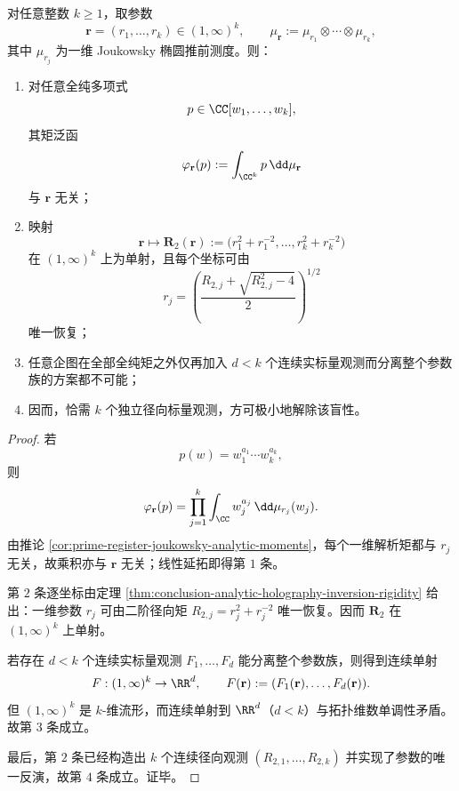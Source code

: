 \begin{theorem}\label{thm:conclusion-joukowsky-product-analytic-blindness-minimal-radial-sufficiency}
对任意整数 \(k\ge 1\)，取参数
\[
\mathbf r=(r_1,\dots,r_k)\in(1,\infty)^k,
\qquad
\mu_{\mathbf r}:=\mu_{r_1}\otimes\cdots\otimes\mu_{r_k},
\]
其中 \(\mu_{r_j}\) 为一维 Joukowsky 椭圆推前测度。则：
\begin{enumerate}
  \item 对任意全纯多项式
        \[
        p\in\CC[w_1,\dots,w_k],
        \]
        其矩泛函
        \[
        \varphi_{\mathbf r}(p):=\int_{\CC^k}p\,\dd\mu_{\mathbf r}
        \]
        与 \(\mathbf r\) 无关；
  \item 映射
        \[
        \mathbf r\longmapsto \mathbf R_2(\mathbf r):=
        \bigl(r_1^2+r_1^{-2},\dots,r_k^2+r_k^{-2}\bigr)
        \]
        在 \((1,\infty)^k\) 上为单射，且每个坐标可由
        \[
        r_j=
        \left(
        \frac{R_{2,j}+\sqrt{R_{2,j}^2-4}}{2}
        \right)^{1/2}
        \]
        唯一恢复；
  \item 任意企图在全部全纯矩之外仅再加入 \(d<k\) 个连续实标量观测而分离整个参数族的方案都不可能；
  \item 因而，恰需 \(k\) 个独立径向标量观测，方可极小地解除该盲性。
\end{enumerate}
\end{theorem}

\begin{proof}
若
\[
p(w)=w_1^{a_1}\cdots w_k^{a_k},
\]
则
\[
\varphi_{\mathbf r}(p)
=
\prod_{j=1}^{k}\int_{\CC} w_j^{a_j}\,\dd\mu_{r_j}(w_j).
\]
由推论 \ref{cor:prime-register-joukowsky-analytic-moments}，每个一维解析矩都与 \(r_j\) 无关，故乘积亦与 \(\mathbf r\) 无关；线性延拓即得第 \(1\) 条。

第 \(2\) 条逐坐标由定理 \ref{thm:conclusion-analytic-holography-inversion-rigidity} 给出：一维参数 \(r_j\) 可由二阶径向矩 \(R_{2,j}=r_j^2+r_j^{-2}\) 唯一恢复。因而 \(\mathbf R_2\) 在 \((1,\infty)^k\) 上单射。

若存在 \(d<k\) 个连续实标量观测 \(F_1,\dots,F_d\) 能分离整个参数族，则得到连续单射
\[
F:(1,\infty)^k\to\RR^d,
\qquad
F(\mathbf r):=(F_1(\mathbf r),\dots,F_d(\mathbf r)).
\]
但 \((1,\infty)^k\) 是 \(k\)-维流形，而连续单射到 \(\RR^d\)（\(d<k\)）与拓扑维数单调性矛盾。故第 \(3\) 条成立。

最后，第 \(2\) 条已经构造出 \(k\) 个连续径向观测 \((R_{2,1},\dots,R_{2,k})\) 并实现了参数的唯一反演，故第 \(4\) 条成立。证毕。
\end{proof}


